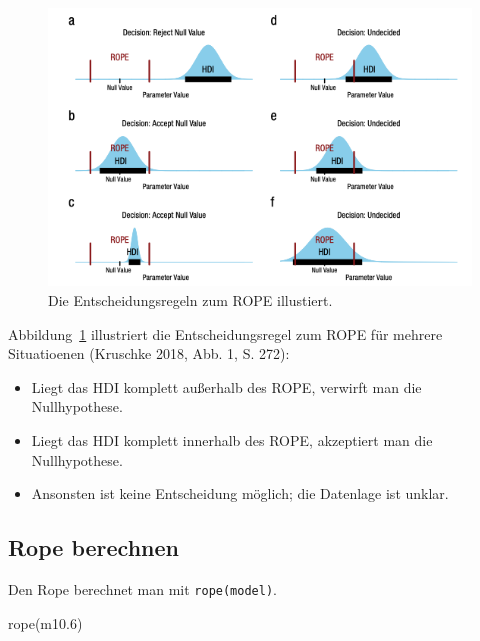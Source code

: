 \documentclass[
  a4paper,
  DIV=11]{scrreprt}
\newenvironment{Shaded}{\begin{snugshade}}{\end{snugshade}}
\newcommand{\FloatTok}[1]{\textcolor[rgb]{0.68,0.00,0.00}{#1}}
\newcommand{\FunctionTok}[1]{\textcolor[rgb]{0.28,0.35,0.67}{#1}}
\newcommand{\NormalTok}[1]{\textcolor[rgb]{0.00,0.23,0.31}{#1}}
\providecommand{\tightlist}{%
  \setlength{\itemsep}{0pt}\setlength{\parskip}{0pt}}\usepackage{longtable,booktabs,array}
\theoremstyle{definition}
\theoremstyle{remark}
\begin{document}
\begin{figure}

{\centering \includegraphics[width=1\textwidth,height=\textheight]{./img/Kruschke-2018-Fig1.png}

}

\caption{\label{fig-kruschke-rope}Die Entscheidungsregeln zum ROPE
illustiert.}

\end{figure}

Abbildung~\ref{fig-kruschke-rope} illustriert die Entscheidungsregel zum
ROPE für mehrere Situatioenen (Kruschke 2018, Abb. 1, S. 272):

\begin{itemize}
\tightlist
\item
  Liegt das HDI komplett außerhalb des ROPE, verwirft man die
  Nullhypothese.
\item
  Liegt das HDI komplett innerhalb des ROPE, akzeptiert man die
  Nullhypothese.
\item
  Ansonsten ist keine Entscheidung möglich; die Datenlage ist unklar.
\end{itemize}

\hypertarget{rope-berechnen}{%
\subsection{Rope berechnen}\label{rope-berechnen}}

Den Rope berechnet man mit \texttt{rope(model)}.

\begin{Shaded}
\begin{Highlighting}[]
\FunctionTok{rope}\NormalTok{(m10}\FloatTok{.6}\NormalTok{)}
\end{Highlighting}
\end{Shaded}
\end{document}
